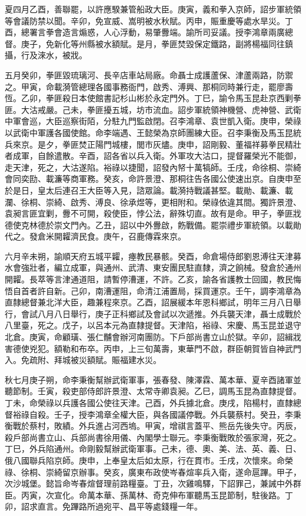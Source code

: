 \begin{pinyinscope}
夏四月乙酉，善聯罷，以許應騤兼管船政大臣。庚寅，義和拳入京師，詔步軍統領等會議防禁以聞。辛卯，免宣威、嵩明被水秋賦。丙申，賑重慶等處水旱災。丁酉，總署言拳會造言煽惑，人心浮動，易肇釁端。諭所司妥議。授李鴻章兩廣總督。庚子，免新化等州縣被水額賦。是月，拳匪焚毀保定鐵路，副將楊福同往鎮攝，行及淶水，被戕。

五月癸卯，拳匪毀琉璃河、長辛店車站局廠。命聶士成護蘆保、津蘆兩路，防禦之。甲寅，命載漪管總理各國事務衙門，啟秀、溥興、那桐同時兼行走，罷廖壽恆。乙卯，拳匪殺日本使館書記杉山彬於永定門外。丁巳，諭令馬玉昆赴京西剿拳匪。大沽戒嚴。己未，拳匪擾五城，坊市流血。詔步軍統領神機營、虎神營、武衛中軍會巡，大臣巡察街陌，分駐九門監啟閉。召李鴻章、袁世凱入衛。庚申，榮祿以武衛中軍護各國使館。命李端遇、王懿榮為京師團練大臣。召李秉衡及馬玉昆統兵來京。是夕，拳匪焚正陽門城樓，閭市灰燼。庚申，詔剛毅、董福祥募拳民精壯者成軍，自餘遣散。辛酉，詔各省以兵入衛。外軍攻大沽口，提督羅榮光不能御，走天津，死之，大沽遂陷。裕祿以捷聞，詔發內帑十萬犒師。壬戌，命徐桐、崇綺會同奕劻、載濂等商軍務。癸亥，命許景澄、那桐往告各國公使速出京。自庚申至於是日，皇太后連召王大臣等入見，諮眾論。載漪持戰議甚堅。載勛、載濂、載瀾、徐桐、崇綺、啟秀、溥良、徐承煜等，更相附和。榮祿依違其間。獨許景澄、袁昶言匪宜剿，釁不可開，殺使臣，悖公法，辭殊切直。故有是命。甲子，拳匪戕德使克林德於崇文門內。乙丑，詔以中外釁啟，飭戰備。罷崇禮步軍統領。以載勛代之。發倉米開糶濟民食。庚午，召鹿傳霖來京。

六月辛未朔，諭順天府五城平糶，瘞教民暴骸。癸酉，命倉場侍郎劉恩溥往天津募水會強壯者，編立成軍，與通州、武清、東安團民駐直隸，濟之餉械。發倉於通州開糶。長萃等言津通道阻，請暫停漕運，不許。乙亥，諭各省護教士回國，教民悔悟自首者許自新。己卯，南漕運阻，命清江浦置局，採買運京。壬午，調李鴻章為直隸總督兼北洋大臣，趣兼程來京。乙酉，詔展緩本年恩科鄉試，明年三月八日舉行，會試八月八日舉行，庚子正科鄉試及會試以次遞推。外兵襲天津，聶士成戰於八里臺，死之。戊子，以呂本元為直隸提督。天津陷，裕祿、宋慶、馬玉昆並退守北倉。庚寅，命顧璜、張仁黼會辦河南團防。下戶部尚書立山於獄。辛卯，詔緝戕害德使兇犯。額勒和布卒。丙申，上三旬萬壽，東華門不啟，群臣朝賀皆自神武門入。免疏附、拜城被災額賦。賑福建水災。

秋七月庚子朔，命李秉衡幫辦武衛軍事，張春發、陳澤霖、萬本華、夏辛酉諸軍並聽節制。壬寅，殺吏部侍郎許景澄、太常寺卿袁昶。乙巳，調馬玉昆為直隸提督。丁未，命榮祿以兵護各國公使往天津。己酉，外兵據北倉。庚戌，陷楊村，直隸總督裕祿自殺。壬子，授李鴻章全權大臣，與各國議停戰。外兵襲蔡村。癸丑，李秉衡戰於蔡村，敗績。外兵進占河西塢。甲寅，增祺言蓋平、熊岳先後失守。丙辰，殺戶部尚書立山、兵部尚書徐用儀、內閣學士聯元。李秉衡戰敗於張家灣，死之。丁巳，外兵陷通州。命剛毅幫辦武衛軍事。己未，德、奧、美、法、英、義、日、俄八國聯兵陷京師。庚申，上奉皇太后如太原，行在貫市。壬戌，次懷來。命榮祿、徐桐、崇綺留京辦事。癸亥，廣東布政使岑春煊率兵入衛，遂命扈蹕。甲子，次沙城堡。懿旨命岑春煊督理前路糧臺。丁丑，次雞鳴驛，下詔罪己，兼誡中外群臣。丙寅，次宣化。命萬本華、孫萬林、奇克伸布軍聽馬玉昆節制，駐後路。丁卯，詔求直言。免蹕路所過宛平、昌平等處錢糧一年。


\end{pinyinscope}
